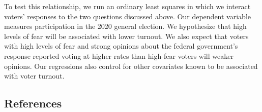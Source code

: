 \documentclass[
  12pt,
]{article}
\begin{document}
To test this relationship, we run an ordinary least squares in which we interact voters' responses to the two questions discussed above. Our dependent variable measures participation in the 2020 general election. We hypothesize that high levels of fear will be associated with lower turnout. We also expect that voters with high levels of fear and strong opinions about the federal government's response reported voting at higher rates than high-fear voters will weaker opinions. Our regressions also control for other covariates known to be associated with voter turnout.

\newpage

\hypertarget{references}{%
\subsection*{References}\label{references}}
\end{document}

